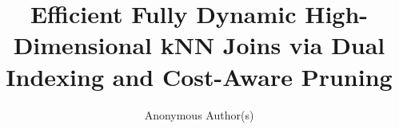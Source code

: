 \documentclass[sigconf,anonymous,review]{acmart}
\theoremstyle{plain}
\theoremstyle{definition}
\theoremstyle{remark}
\theoremstyle{definition}
\theoremstyle{remark}
\begin{document}
\title{Efficient Fully Dynamic High-Dimensional kNN Joins via Dual Indexing and Cost-Aware Pruning}

\author{Anonymous Author(s)}

\end{document}

